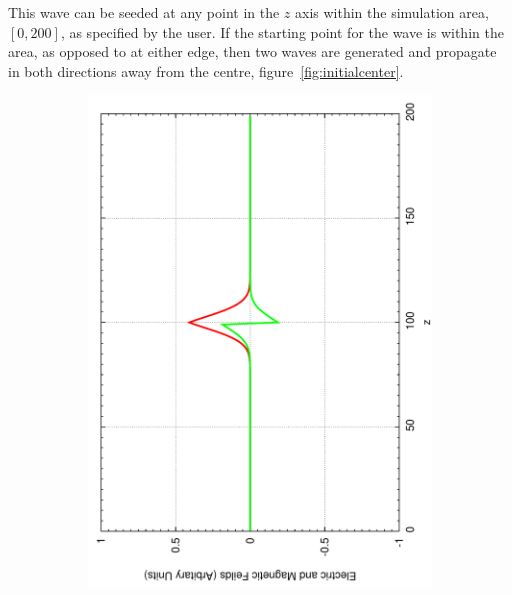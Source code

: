 This wave can be seeded at any point in the $z$ axis within the simulation area, $[0,200]$, as specified by the user. If the starting point for the wave is within the area, as opposed to at either edge, then two waves are generated and propagate in both directions away from the centre, figure~\ref{fig:initialcenter}.
\begin{figure}[ht]
        \centering
        \begin{subfigure}[ht]{0.45\textwidth}
                \centering
                \includegraphics[angle=270, width=\textwidth]{centerseed1.pdf}
        \end{subfigure}%
        ~
        \begin{subfigure}[ht]{0.45\textwidth}
                \centering

\end{subfigure}
\end{figure}
